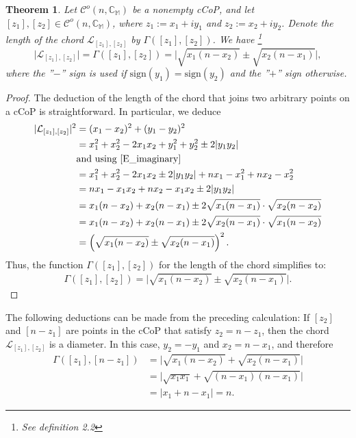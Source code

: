 \documentclass[12pt]{amsart}
\newtheorem{theorem}{Theorem}[section]
\theoremstyle{definition}
\theoremstyle{remark}
\numberwithin{equation}{section}
\newcommand{\abs}[1]{\lvert#1\rvert}
\newcommand{\C}{\mathcal{C}}
\newcommand{\CC}{\mathbb{C}}
\newcommand{\M}{\mathbb{M}}
\newcommand{\mc}[1]{\mathcal{#1}}
\begin{document}
\begin{theorem}
Let $\C^o(n,\CC_{\M})$ be a nonempty cCoP, and let $[z_1], [z_2]\in\C^o(n,\CC_{\M})$, where $z_1:=x_1+iy_1$ and $z_2:=x_2+iy_2$. Denote the length of the chord $\mc{L}_{[z_1],[z_2]}$ by $\Gamma([z_1],[z_2])$. We have
\footnote{See \cite[p.2]{CoP} definition 2.2}
\[
\abs{\mc{L}_{[z_1],[z_2]}}=
\Gamma([z_1],[z_2])=
\abs{\sqrt{x_1(n-x_2)}\pm \sqrt{x_2(n-x_1)}},
\]
where the ''$-$'' sign is used if $\mathrm{sign}(y_1)=\mathrm{sign}(y_2)$ and the ''$+$'' sign otherwise.
\end{theorem}

\begin{proof}
The deduction of the length of the chord that joins two arbitrary points on a cCoP is straightforward. In particular, we deduce
\begin{align*}
\abs{\mc{L}_{[z_1],[z_2]}}^2
&=(x_1-x_2)^2+(y_1-y_2)^2\\
&=x_1^2+x_2^2-2x_1x_2+y_1^2+y_2^2\pm 2\abs{y_1y_2}\\
&\mbox{and using \eqref{E_imaginary}}\\
&=x_1^2+x_2^2-2x_1x_2\pm 2\abs{y_1y_2}+nx_1-x_1^2+nx_2-x_2^2\\
&=nx_1-x_1x_2+nx_2-x_1x_2\pm 2\abs{y_1y_2}\\
&=x_1(n-x_2)+x_2(n-x_1)\pm 2\sqrt{x_1(n-x_1)}\cdot\sqrt{x_2(n-x_2)}\\
&=x_1(n-x_2)+x_2(n-x_1)\pm 2\sqrt{x_2(n-x_1)}\cdot\sqrt{x_1(n-x_2)}\\
&=\left(\sqrt{x_1(n-x_2)}\pm \sqrt{x_2(n-x_1)} \right)^2.
\end{align*}
Thus, the function $\Gamma([z_1],[z_2])$ for the length of the chord simplifies to:
\begin{align}\label{E_Gamma}
\Gamma([z_1],[z_2])=\abs{\sqrt{x_1(n-x_2)}\pm \sqrt{x_2(n-x_1)}}.
\end{align}
\end{proof}
\bigskip

The following deductions can be made from the preceding calculation: If $[z_2]$ and $[n-z_1]$ are points in the cCoP that satisfy $z_2=n-z_1$, then the chord $\mc{L}_{[z_1],[z_2]}$ is a diameter. In this case, $y_2=-y_1$ and $x_2=n-x_1$, and therefore
\begin{align*}
\Gamma([z_1],[n-z_1])
&=\abs{\sqrt{x_1(n-x_2)}+\sqrt{x_2(n-x_1)}}\\
&=\abs{\sqrt{x_1 x_1}+\sqrt{(n-x_1)(n-x_1)}}\\
&=\abs{x_1+n-x_1}=n.
\end{align*}
\end{document}
